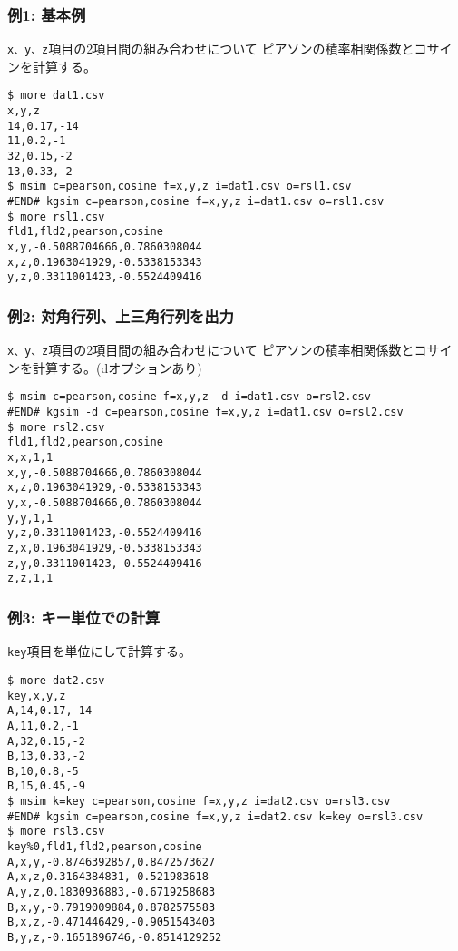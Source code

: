 \subsubsection*{例1: 基本例}

\verb|x、y、z|項目の2項目間の組み合わせについて
ピアソンの積率相関係数とコサインを計算する。


\begin{Verbatim}[baselinestretch=0.7,frame=single]
$ more dat1.csv
x,y,z
14,0.17,-14
11,0.2,-1
32,0.15,-2
13,0.33,-2
$ msim c=pearson,cosine f=x,y,z i=dat1.csv o=rsl1.csv
#END# kgsim c=pearson,cosine f=x,y,z i=dat1.csv o=rsl1.csv
$ more rsl1.csv
fld1,fld2,pearson,cosine
x,y,-0.5088704666,0.7860308044
x,z,0.1963041929,-0.5338153343
y,z,0.3311001423,-0.5524409416
\end{Verbatim}
\subsubsection*{例2: 対角行列、上三角行列を出力}

\verb|x、y、z|項目の2項目間の組み合わせについて
ピアソンの積率相関係数とコサインを計算する。(dオプションあり)


\begin{Verbatim}[baselinestretch=0.7,frame=single]
$ msim c=pearson,cosine f=x,y,z -d i=dat1.csv o=rsl2.csv
#END# kgsim -d c=pearson,cosine f=x,y,z i=dat1.csv o=rsl2.csv
$ more rsl2.csv
fld1,fld2,pearson,cosine
x,x,1,1
x,y,-0.5088704666,0.7860308044
x,z,0.1963041929,-0.5338153343
y,x,-0.5088704666,0.7860308044
y,y,1,1
y,z,0.3311001423,-0.5524409416
z,x,0.1963041929,-0.5338153343
z,y,0.3311001423,-0.5524409416
z,z,1,1
\end{Verbatim}
\subsubsection*{例3: キー単位での計算}

\verb|key|項目を単位にして計算する。


\begin{Verbatim}[baselinestretch=0.7,frame=single]
$ more dat2.csv
key,x,y,z
A,14,0.17,-14
A,11,0.2,-1
A,32,0.15,-2
B,13,0.33,-2
B,10,0.8,-5
B,15,0.45,-9
$ msim k=key c=pearson,cosine f=x,y,z i=dat2.csv o=rsl3.csv
#END# kgsim c=pearson,cosine f=x,y,z i=dat2.csv k=key o=rsl3.csv
$ more rsl3.csv
key%0,fld1,fld2,pearson,cosine
A,x,y,-0.8746392857,0.8472573627
A,x,z,0.3164384831,-0.521983618
A,y,z,0.1830936883,-0.6719258683
B,x,y,-0.7919009884,0.8782575583
B,x,z,-0.471446429,-0.9051543403
B,y,z,-0.1651896746,-0.8514129252
\end{Verbatim}
